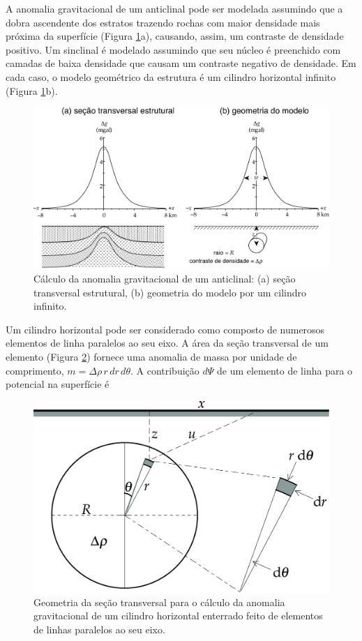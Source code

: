 \documentclass[]{book}
\theoremstyle{definition}
\theoremstyle{definition}
\theoremstyle{definition}
\theoremstyle{remark}
\begin{document}
A anomalia gravitacional de um anticlinal pode ser modelada assumindo que a dobra ascendente dos estratos trazendo rochas com maior densidade mais próxima da superfície (Figura \ref{fig:cilindro1}a), causando, assim, um contraste de densidade positivo. Um sinclinal é modelado assumindo que seu núcleo é preenchido com camadas de baixa densidade que causam um contraste negativo de densidade. Em cada caso, o modelo geométrico da estrutura é um cilindro horizontal infinito (Figura \ref{fig:cilindro1}b).

\begin{figure}

{\centering \includegraphics[width=0.8\linewidth]{fig/Fig_02.44} 

}

\caption{Cálculo da anomalia gravitacional de um anticlinal: (a) seção transversal estrutural, (b) geometria do modelo por um cilindro infinito.}\label{fig:cilindro1}
\end{figure}

Um cilindro horizontal pode ser considerado como composto de numerosos elementos de linha paralelos ao seu eixo. A área da seção transversal de um elemento (Figura \ref{fig:cilindro2}) fornece uma anomalia de massa por unidade de comprimento, \(m=\Delta\rho\, r\,dr\, d\theta\). A contribuição \(d\Psi\) de um elemento de linha para o potencial na superfície é

\begin{figure}

{\centering \includegraphics[width=0.6\linewidth]{fig/Fig_02.45} 

}

\caption{Geometria da seção transversal para o cálculo da anomalia gravitacional de um cilindro horizontal enterrado feito de elementos de linhas paralelos ao seu eixo.}\label{fig:cilindro2}
\end{figure}
\end{document}
